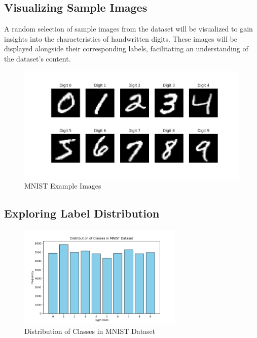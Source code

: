 \subsection{Visualizing Sample Images}

A random selection of sample images from the dataset will be visualized to gain insights into the characteristics of handwritten digits. These images will be displayed alongside their corresponding labels, facilitating an understanding of the dataset's content.

\begin{figure}[htbp]
  \centering
  \includegraphics[width=1.0\textwidth]{figures/mnist_images.png}
  \caption{MNIST Example Images}
  \label{fig:mnist_image}
\end{figure}

\subsection{Exploring Label Distribution}

\begin{figure}[htbp]
  \centering
  \includegraphics[width=0.7\textwidth]{figures/data_distribution.png}
  \caption{Distribution of Classes in MNIST Dataset}
  \label{fig:data_distribution}
\end{figure}

